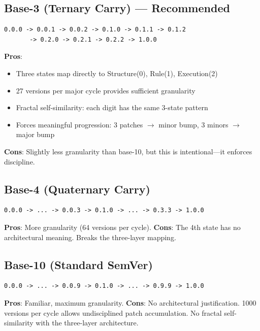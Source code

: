 \documentclass{article}
\begin{document}
\subsection{Base-3 (Ternary Carry) --- Recommended}

\begin{verbatim}
0.0.0 -> 0.0.1 -> 0.0.2 -> 0.1.0 -> 0.1.1 -> 0.1.2
       -> 0.2.0 -> 0.2.1 -> 0.2.2 -> 1.0.0
\end{verbatim}

\textbf{Pros}:
\begin{itemize}
\item Three states map directly to Structure(0), Rule(1), Execution(2)
\item 27 versions per major cycle provides sufficient granularity
\item Fractal self-similarity: each digit has the same 3-state pattern
\item Forces meaningful progression: 3 patches $\to$ minor bump, 3 minors $\to$ major bump
\end{itemize}

\textbf{Cons}: Slightly less granularity than base-10, but this is intentional---it enforces discipline.

\subsection{Base-4 (Quaternary Carry)}

\begin{verbatim}
0.0.0 -> ... -> 0.0.3 -> 0.1.0 -> ... -> 0.3.3 -> 1.0.0
\end{verbatim}

\textbf{Pros}: More granularity (64 versions per cycle).
\textbf{Cons}: The 4th state has no architectural meaning. Breaks the three-layer mapping.

\subsection{Base-10 (Standard SemVer)}

\begin{verbatim}
0.0.0 -> ... -> 0.0.9 -> 0.1.0 -> ... -> 0.9.9 -> 1.0.0
\end{verbatim}

\textbf{Pros}: Familiar, maximum granularity.
\textbf{Cons}: No architectural justification. 1000 versions per cycle allows undisciplined patch accumulation. No fractal self-similarity with the three-layer architecture.
\end{document}
